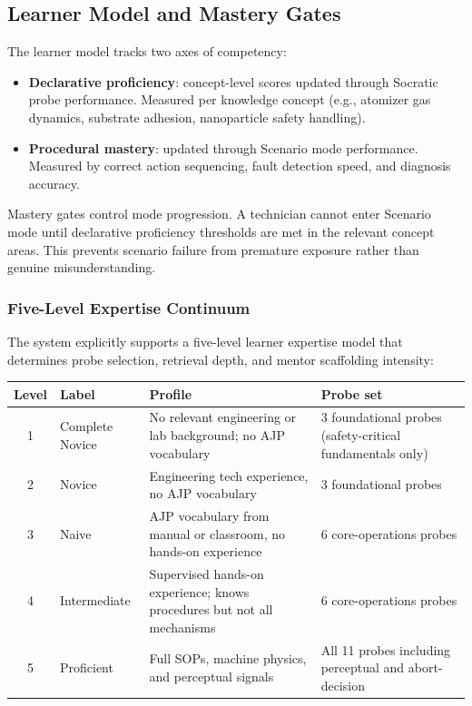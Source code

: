 \documentclass[11pt,letterpaper]{article}
\begin{document}
\subsection{Learner Model and Mastery Gates}
\label{sec:learner-model}

The learner model tracks two axes of competency:

\begin{itemize}
  \item \textbf{Declarative proficiency}: concept-level scores updated through Socratic probe performance. Measured per knowledge concept (e.g., atomizer gas dynamics, substrate adhesion, nanoparticle safety handling).
  \item \textbf{Procedural mastery}: updated through Scenario mode performance. Measured by correct action sequencing, fault detection speed, and diagnosis accuracy.
\end{itemize}

Mastery gates control mode progression. A technician cannot enter Scenario mode until declarative proficiency thresholds are met in the relevant concept areas. This prevents scenario failure from premature exposure rather than genuine misunderstanding.

\subsubsection{Five-Level Expertise Continuum}
\label{sec:five-level}

The system explicitly supports a five-level learner expertise model that determines probe selection, retrieval depth, and mentor scaffolding intensity:

\begin{center}
\begin{tabularx}{\textwidth}{@{}c l X X@{}}
\toprule
\textbf{Level} & \textbf{Label} & \textbf{Profile} & \textbf{Probe set} \\
\midrule
1 & Complete Novice & No relevant engineering or lab background; no AJP vocabulary & 3 foundational probes (safety-critical fundamentals only) \\
2 & Novice & Engineering tech experience, no AJP vocabulary & 3 foundational probes \\
3 & Naive & AJP vocabulary from manual or classroom, no hands-on experience & 6 core-operations probes \\
4 & Intermediate & Supervised hands-on experience; knows procedures but not all mechanisms & 6 core-operations probes \\
5 & Proficient & Full SOPs, machine physics, and perceptual signals & All 11 probes including perceptual and abort-decision \\
\bottomrule
\end{tabularx}
\end{center}
\end{document}
